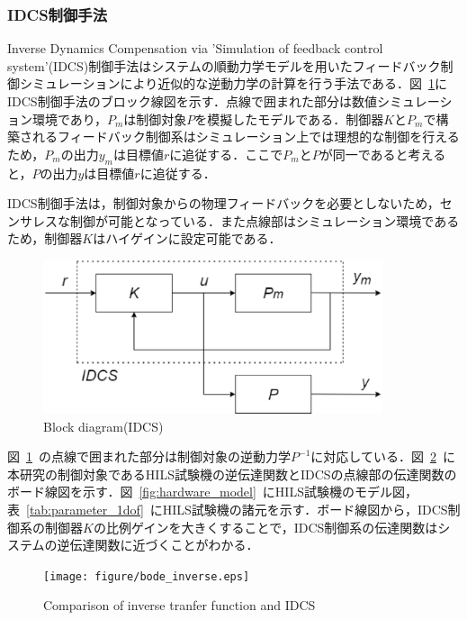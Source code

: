 \documentclass[a4paper,12pt]{article_vdlab_sotsuron}
\begin{document}
\subsubsection{IDCS制御手法}
Inverse Dynamics Compensation via 'Simulation of feedback control system'(IDCS)制御手法はシステムの順動力学モデルを用いたフィードバック制御シミュレーションにより近似的な逆動力学の計算を行う手法である\cite{method_idcs}．図~\ref{fig:idcs_block}にIDCS制御手法のブロック線図を示す．点線で囲まれた部分は数値シミュレーション環境であり，$P_m$は制御対象$P$を模擬したモデルである．制御器$K$と$P_m$で構築されるフィードバック制御系はシミュレーション上では理想的な制御を行えるため，$P_m$の出力$y_m$は目標値$r$に追従する．ここで$P_m$と$P$が同一であると考えると，$P$の出力$y$は目標値$r$に追従する．

IDCS制御手法は，制御対象からの物理フィードバックを必要としないため，センサレスな制御が可能となっている．また点線部はシミュレーション環境であるため，制御器$K$はハイゲインに設定可能である．

\vspace*{10mm}
\begin{figure}[htp]
  \begin{center}
    \includegraphics[height=45mm]{figure/idcs_block.eps}
    \vspace*{3mm}
    \caption{Block diagram(IDCS)}
    \label{fig:idcs_block}
  \end{center}
\end{figure}
\newpage

図~\ref{fig:idcs_block}~の点線で囲まれた部分は制御対象の逆動力学$P^{-1}$に対応している．図~\ref{fig:bode_inv_idcs}~に本研究の制御対象であるHILS試験機の逆伝達関数とIDCSの点線部の伝達関数のボード線図を示す．図~\ref{fig:hardware_model}~にHILS試験機のモデル図，表~\ref{tab:parameter_1dof}~にHILS試験機の諸元を示す．ボード線図から，IDCS制御系の制御器$K$の比例ゲインを大きくすることで，IDCS制御系の伝達関数はシステムの逆伝達関数に近づくことがわかる．

\vspace*{10mm}
\begin{figure}[htp]
  \begin{center}
    \texttt{[image: figure/bode\_inverse.eps]}
    \caption{Comparison of inverse tranfer function and IDCS}
    \label{fig:bode_inv_idcs}
  \end{center}
\end{figure}
\end{document}
